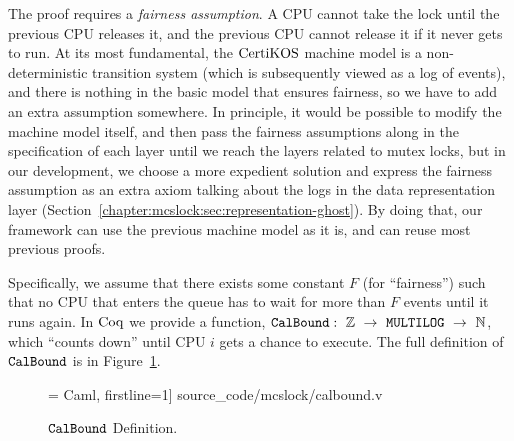 The proof requires a \emph{fairness assumption}.
A CPU cannot take the lock until the previous CPU releases it, 
and the previous CPU cannot release it if it never gets to run. 
At its most fundamental, the $\mathrm{CertiKOS}$ machine model is a non-deterministic 
transition system (which is subsequently viewed as a log of events), 
and there is nothing in the basic model that ensures fairness, 
so we have to add an extra assumption somewhere. In principle, it would be 
possible to modify the machine model itself, and then pass the fairness assumptions 
along in the specification of each layer until we reach the layers related to mutex locks, 
but in our development, we choose a more expedient solution and express
the fairness assumption as an extra axiom talking about the logs 
in the data representation layer (Section~\ref{chapter:mcslock:sec:representation-ghost}). 
By doing that, our framework can use the previous machine 
model as it is, and can reuse most previous proofs.

Specifically, we assume that there exists some constant $F$ (for ``fairness'') such that no CPU that enters the queue has to wait for more than $F$ events until it runs again. 
In $\mathrm{Coq}$ we provide a function, $\CalBound:\ \ztype\ \rightarrow\ \lockmultilog\ \rightarrow \ \nattype$,
which ``counts down'' 
until CPU $i$ gets a chance to 
execute. 
The full definition of ${\mathrm{\texttt{CalBound}}}$ is in Figure~\ref{fig:chapter:mcslock:calbound-definition}.


\begin{figure}
\begin{center}
 = Caml, firstline=1] {source_code/mcslock/calbound.v}
\end{center}
\caption{${\mathrm{\texttt{CalBound}}}$ Definition.}
\label{fig:chapter:mcslock:calbound-definition}
\end{figure}

